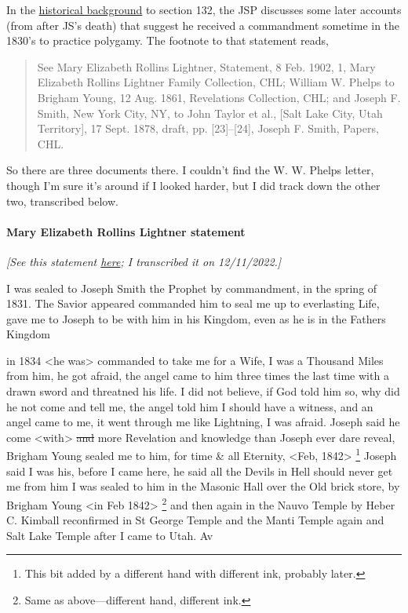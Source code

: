 			In the \hyperref[DC132-HB]{historical background} to section 132, the JSP discusses some later accounts (from after JS's death) that suggest he received a commandment sometime in the 1830's to practice polygamy. The footnote to that statement reads,
			
				\begin{quote}
					See Mary Elizabeth Rollins Lightner, Statement, 8 Feb. 1902, 1, Mary Elizabeth Rollins Lightner Family Collection, CHL; William W. Phelps to Brigham Young, 12 Aug. 1861, Revelations Collection, CHL; and Joseph F. Smith, New York City, NY, to John Taylor et al., [Salt Lake City, Utah Territory], 17 Sept. 1878, draft, pp. [23]--[24], Joseph F. Smith, Papers, CHL.
				\end{quote}
				
			So there are three documents there. I couldn't find the W. W. Phelps letter, though I'm sure it's around if I looked harder, but I did track down the other two, transcribed below.
			
			\paragraph{Mary Elizabeth Rollins Lightner statement}
			
				\textit{[See this statement \href{https://drive.google.com/file/d/1HNPfeUZJvcybILOrJOdY3JLZmrdTuXnS/view?usp=share_link}{here}; I transcribed it on 12/11/2022.]}
				
				I was sealed to Joseph Smith the Prophet by commandment, in the spring of 1831. The Savior appeared commanded him to seal me up to everlasting Life, gave me to Joseph to be with him in his Kingdom, even as he is in the Fathers Kingdom
				
				in 1834 <he was> commanded to take me for a Wife, I was a Thousand Miles from him, he got afraid, the angel came to him three times the last time with a drawn sword and threatned his life. I did not believe, if God told him so, why did he not come and tell me, the angel told him I should have a witness, and an angel came to me, it went through me like Lightning, I was afraid. Joseph said he come <with> \sout{and} more Revelation and knowledge than Joseph ever dare reveal, Brigham Young sealed me to him, for time \& all Eternity, <Feb, 1842>%
					\footnote{%
						This bit added by a different hand with different ink, probably later.
						}
				Joseph said I was his, before I came here, he said all the Devils in Hell should never get me from him I was sealed to him in the Masonic Hall over the Old brick store, by Brigham Young <in Feb 1842>%
					\footnote{%
						Same as above---different hand, different ink.
						} 
				and then again in the Nauvo Temple by Heber C. Kimball reconfirmed in St George Temple and the Manti Temple again and Salt Lake Temple after I came to Utah. Av
				
